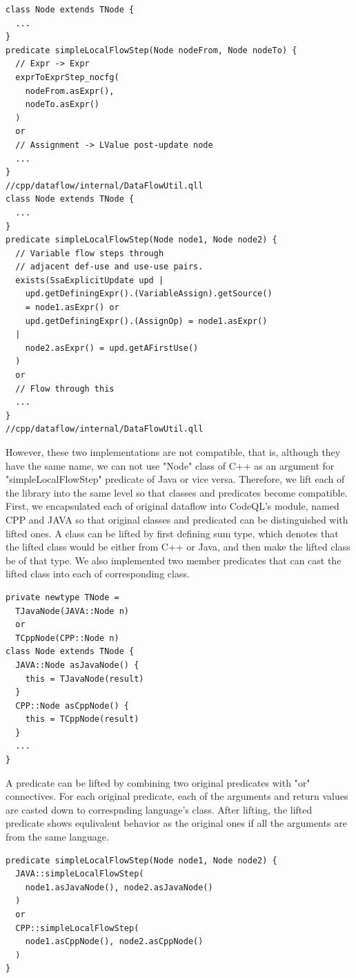 \begin{lstlisting}[style=codeql,xleftmargin=2.5em]
class Node extends TNode {
  ...
}
predicate simpleLocalFlowStep(Node nodeFrom, Node nodeTo) {
  // Expr -> Expr
  exprToExprStep_nocfg(
    nodeFrom.asExpr(),
    nodeTo.asExpr()
  )
  or
  // Assignment -> LValue post-update node
  ...
}
//cpp/dataflow/internal/DataFlowUtil.qll
class Node extends TNode {
  ...
}
predicate simpleLocalFlowStep(Node node1, Node node2) {
  // Variable flow steps through
  // adjacent def-use and use-use pairs.
  exists(SsaExplicitUpdate upd |
    upd.getDefiningExpr().(VariableAssign).getSource()
    = node1.asExpr() or
    upd.getDefiningExpr().(AssignOp) = node1.asExpr()
  |
    node2.asExpr() = upd.getAFirstUse()
  )
  or
  // Flow through this
  ...
}
//cpp/dataflow/internal/DataFlowUtil.qll
\end{lstlisting}
However, these two implementations are not compatible, that is, although they have the same name,
we can not use "Node" class of C++ as an argument for "simpleLocalFlowStep" predicate of Java or vice versa.
Therefore, we lift each of the library into the same level so that classes and predicates become compatible.
First, we encapsulated each of original dataflow into CodeQL's module, named CPP and JAVA so that
original classes and predicated can be distinguished with lifted ones.
A class can be lifted by first defining sum type, which denotes that the lifted class would be either from C++ or
Java, and then make the lifted class be of that type. We also implemented two member predicates that can cast
the lifted class into each of corresponding class.
\begin{lstlisting}[style=codeql,xleftmargin=2.5em]
private newtype TNode =
  TJavaNode(JAVA::Node n)
  or
  TCppNode(CPP::Node n)
class Node extends TNode {
  JAVA::Node asJavaNode() {
    this = TJavaNode(result)
  }
  CPP::Node asCppNode() {
    this = TCppNode(result)
  }
  ...
}
\end{lstlisting}

A predicate can be lifted by combining two original predicates with "or" connectives.
For each original predicate, each of the arguments and return values are casted down to
correspnding language's class. After lifting, the lifted predicate shows equlivalent behavior
as the original ones if all the arguments are from the same language.
\begin{lstlisting}[style=codeql,xleftmargin=2.5em]
predicate simpleLocalFlowStep(Node node1, Node node2) {
  JAVA::simpleLocalFlowStep(
    node1.asJavaNode(), node2.asJavaNode()
  )
  or
  CPP::simpleLocalFlowStep(
    node1.asCppNode(), node2.asCppNode()
  )
}
\end{lstlisting}
